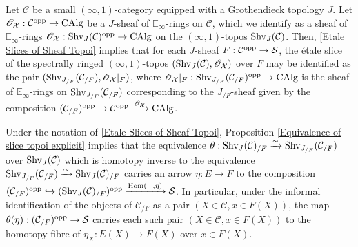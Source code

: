 \documentclass[10pt]{article}
\newcommand{\Ei}{{\mathbb{E}_{\infty}}}
\newcommand{\mS}{\mathcal S}
\newcommand{\C}{\mathcal C}
\newcommand{\scO}{\mathscr O}
\newcommand{\cX}{\mathcal{X}}
\theoremstyle{witharg}
\theoremstyle{witharg}
\theoremstyle{witharg2}
\begin{document}
\begin{remark}{}

    Let $\C$ be a small $(\infty,1)$-category equipped with a  Grothendieck topology $J$. Let $\scO_\cX:\C^{\textnormal{opp}}\rightarrow \textnormal{CAlg}$ be a $J$-sheaf of $\Ei$-rings on $\C$, which we identify as a sheaf of $\Ei$-rings $\scO_\cX:\textnormal{Shv}_J(\C)^{\textnormal{opp}}\rightarrow \textnormal{CAlg}$ on the $(\infty,1)$-topos $\textnormal{Shv}_J(\C)$. Then, \ref{Etale Slices of Sheaf Topoi} implies that for each $J$-sheaf $F:\C^{\textnormal{opp}}\rightarrow \mS$, the \'{e}tale slice of the spectrally ringed $(\infty,1)$-topos $(\textnormal{Shv}_J(\C),\scO_\cX)$ over $F$ may be identified as the pair $(\textnormal{Shv}_{J_{/F}}(\C_{/F}),\scO_\cX|_F)$, where $\scO_\cX|_F:\textnormal{Shv}_{J_{/F}}(\C_{/F})^{\textnormal{opp}}\rightarrow \textnormal{CAlg}$ is the sheaf of $\Ei$-rings on $\textnormal{Shv}_{J_{/F}}(\C_{/F})$ corresponding to the $J_{/F}$-sheaf given by the composition $(\C_{/F})^{\textnormal{opp}}\rightarrow \C^{\textnormal{opp}}\xrightarrow{\scO_\cX}\textnormal{CAlg}$. 
\end{remark}


\begin{remark}{}\label{Equivalence of slice topoi explicit Remark}

    Under the notation of \ref{Etale Slices of Sheaf Topoi}, Proposition \ref{Equivalence of slice topoi explicit} implies that the equivalence $\theta:\textnormal{Shv}_J(\C)_{/F}\xrightarrow{\sim}\textnormal{Shv}_{J_{/F}}(\C_{/F})$ over $\textnormal{Shv}_J(\C)$ which is homotopy inverse to the equivalence $\textnormal{Shv}_{J_{/F}}(\C_{/F})\xrightarrow{\sim}\textnormal{Shv}_J(\C)_{/F}$ carries an arrow $\eta:E\rightarrow F$ to the composition $(\C_{/F})^{\textnormal{opp}}\hookrightarrow (\textnormal{Shv}_J(\C)_{/F})^{\textnormal{opp}}\xrightarrow{\textnormal{Hom}(-,\eta)}\mS$. In particular, under the informal identification of the objects of $\C_{/F}$ as a pair $(X\in \C,x\in F(X))$, the map $\theta(\eta):(\C_{/F})^{\textnormal{opp}}\rightarrow \mS$ carries each such pair $(X\in \C,x\in F(X))$ to the homotopy fibre of $\eta_X:E(X)\rightarrow F(X)$ over $x\in F(X)$. 
    
\end{remark}
\end{document}
